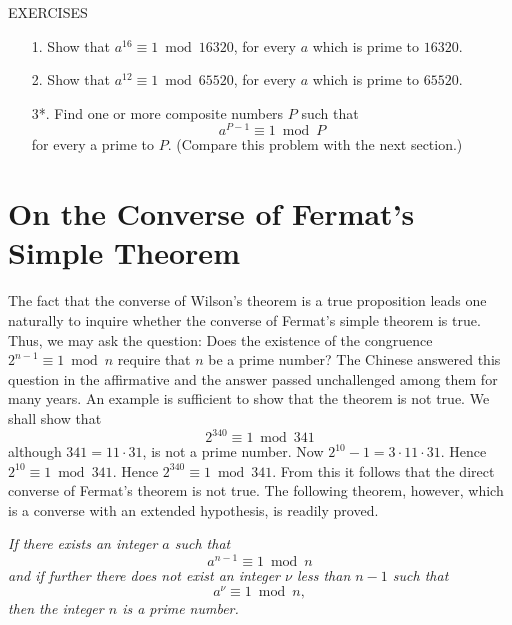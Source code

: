 \documentclass[oneside]{book}
\begin{document}
\begin{center}
EXERCISES
\end{center}

\small \begin{enumerate}
\item[1.] Show that $a^{16} \equiv 1 \bmod 16320$, for every $a$
which is prime to $16320$.

\item[2.] Show that $a^{12} \equiv 1 \bmod 65520$, for every $a$ which
is prime to $65520$.

\item[3*.] Find one or more composite numbers $P$ such that
\begin{equation*}
a^{P-1} \equiv 1 \bmod P
\end{equation*}
for every a prime to $P$. (Compare this problem with the next
section.) \end{enumerate} \normalsize%

\section{On the Converse of Fermat's Simple Theorem}\label{s29}%

The fact that the converse of Wilson's theorem is a true proposition
leads one naturally to inquire whether the converse of Fermat's
simple theorem is true. Thus, we may ask the question: Does the
existence of the congruence $2^{n-1} \equiv 1 \bmod n$ require that
$n$ be a prime number? The Chinese answered this question in the
affirmative and the answer passed unchallenged among them for many
years. An example is sufficient to show that the theorem is not
true. We shall show that
\begin{equation*}
2^{340} \equiv 1 \bmod 341
\end{equation*}
although $341 = 11 \cdot 31$, is not a prime number. Now $2^{10}-1 =
3 \cdot 11 \cdot 31$. Hence $2^{10} \equiv 1 \bmod 341$. Hence
$2^{340} \equiv 1 \bmod 341$. From this it follows that the direct
converse of Fermat's theorem is not true. The following theorem,
however, which is a converse with an extended hypothesis, is readily
proved.

\smallskip \emph{If there exists an integer $a$ such that}
\begin{equation*}
a^{n-1} \equiv 1 \bmod n
\end{equation*}
\emph{and if further there does not exist an integer $\nu$ less than
$n - 1$ such that}
\begin{equation*}
a^{\nu} \equiv 1 \bmod n,
\end{equation*}
\emph{then the integer $n$ is a prime number.}
\end{document}
